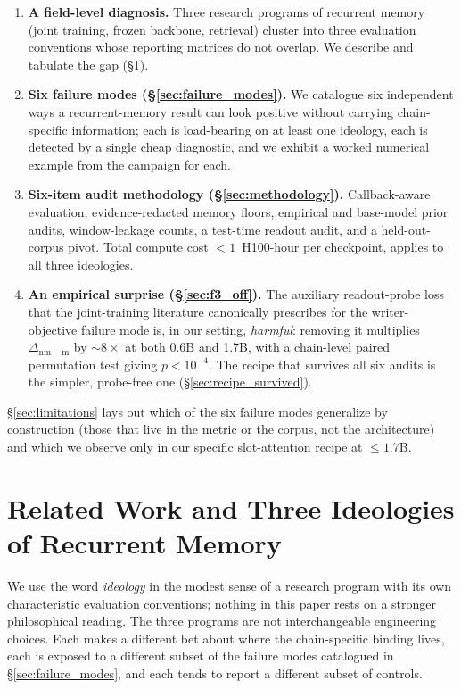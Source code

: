\documentclass{article}
\newcommand{\dnm}{\Delta_{\mathrm{nm-m}}}
\begin{document}
\begin{enumerate}\setlength{\itemsep}{0.5pt}
\item \textbf{A field-level diagnosis.}  Three research programs of
recurrent memory (joint training, frozen backbone, retrieval) cluster
into three evaluation conventions whose reporting matrices do not
overlap.  We describe and tabulate the gap (\S\ref{sec:ideologies}).
\item \textbf{Six failure modes (\S\ref{sec:failure_modes}).}  We
catalogue six independent ways a recurrent-memory result can look
positive without carrying chain-specific information; each is
load-bearing on at least one ideology, each is detected by a single
cheap diagnostic, and we exhibit a worked numerical example from the
campaign for each.
\item \textbf{Six-item audit methodology (\S\ref{sec:methodology}).}
Callback-aware evaluation, evidence-redacted memory floors, empirical
and base-model prior audits, window-leakage counts, a test-time
readout audit, and a held-out-corpus pivot.  Total compute cost
$<\!1$~H100-hour per checkpoint, applies to all three ideologies.
\item \textbf{An empirical surprise (\S\ref{sec:f3_off}).}  The
auxiliary readout-probe loss that the joint-training literature
canonically prescribes for the writer-objective failure mode is, in
our setting, \emph{harmful}: removing it multiplies $\dnm$ by
$\sim\!8\times$ at both 0.6B and 1.7B, with a chain-level paired
permutation test giving $p < 10^{-4}$.  The recipe that survives all
six audits is the simpler, probe-free one
(\S\ref{sec:recipe_survived}).
\end{enumerate}

\S\ref{sec:limitations} lays out which of the six failure modes
generalize by construction (those that live in the metric or the
corpus, not the architecture) and which we observe only in our
specific slot-attention recipe at $\le 1.7$B.

\section{Related Work and Three Ideologies of Recurrent Memory}
\label{sec:ideologies}

We use the word \emph{ideology} in the modest sense of a research
program with its own characteristic evaluation conventions; nothing
in this paper rests on a stronger philosophical reading.  The three
programs are not interchangeable engineering choices.  Each makes a
different bet about where the chain-specific binding lives, each is
exposed to a different subset of the failure modes catalogued in
\S\ref{sec:failure_modes}, and each tends to report a different
subset of controls.
\end{document}
